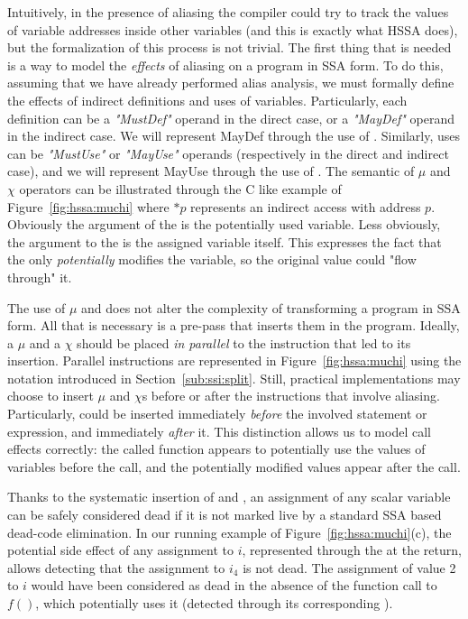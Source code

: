 Intuitively, in the presence of aliasing the compiler could try to track the values of variable addresses inside other variables (and this is exactly what HSSA does), but the formalization of this process is not trivial.
The first thing that is needed is a way to model the {\em effects} of aliasing on a program in SSA form.
To do this, assuming that we have already performed alias analysis, we must formally define the effects of indirect definitions and uses of variables.
Particularly, each definition can be a {\em "MustDef"} operand in the direct case, or a {\em "MayDef"} operand in the indirect case. We will represent MayDef through the use of \chifuns.
Similarly, uses can be {\em "MustUse"} or {\em "MayUse"} operands (respectively in the direct and indirect case), and we will represent MayUse  through the use of \mufuns.
The semantic of $\mu$ and $\chi$ operators can be illustrated through the C like example of Figure~\ref{fig:hssa:muchi} where $*p$ represents an indirect access with address $p$.
Obviously the argument of the \muop is the potentially used variable.
Less obviously, the argument to the \chiop is the assigned variable itself. This expresses the fact that the \chiop only {\em potentially} modifies the variable, so the original value could "flow through" it. 

The use of $\mu$ and \chiops does not alter the complexity of transforming a program in SSA form. All that is necessary is a pre-pass that inserts them in the program. Ideally, a $\mu$ and a $\chi$ should be placed \emph{in parallel} to the instruction that led to its insertion. Parallel instructions are represented in Figure~\ref{fig:hssa:muchi} using the notation introduced in Section~\ref{sub:ssi:split}. Still, practical implementations may choose to insert $\mu$ and $\chi$s before or after the instructions that involve aliasing. Particularly, \mufuns could be inserted immediately {\em before} the involved statement or expression, and \chiops immediately {\em after} it. This distinction allows us to model call effects correctly: the called function appears to potentially use the values of variables before the call, and the potentially modified values appear after the call.

Thanks to the systematic insertion of \mufuns and \chifuns, an assignment of any scalar variable can be safely considered dead if it is not marked live by a standard SSA based dead-code elimination. In our running example of Figure~\ref{fig:hssa:muchi}(c), the potential side effect of any assignment to $i$, represented through the \mufun at the return, allows detecting that the assignment to $i_4$ is not dead. The assignment of value 2 to $i$ would have been considered as dead in the absence of the function call to $f()$, which potentially uses it (detected through its corresponding \mufun). 



